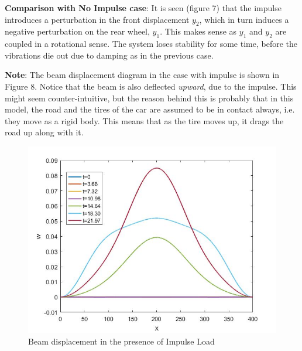 \documentclass[11pt, oneside]{article}   	%
\begin{document}
\noindent \textbf{Comparison with No Impulse case}: It is seen (figure 7) that the impulse introduces a perturbation in the front displacement $y_2$, which in turn induces a negative perturbation on the rear wheel, $y_1$. This makes sense as $y_1$ and $y_2$ are coupled in a rotational sense. The system loses stability for some time, before the vibrations die out due to damping as in the previous case. 

\pagebreak
\noindent \textbf{Note}: The beam displacement diagram in the case with impulse is shown in Figure 8. Notice that the beam is also deflected \textit{upward}, due to the impulse. This might seem counter-intuitive, but the reason behind this is probably that in this model, the road and the tires of the car are assumed to be in contact always, i.e. they move as a rigid body. This means that as the tire moves up, it drags the road up along with it.
\begin{figure}[!htbp]
	\centering
	\includegraphics[scale=0.5]{BeamDispImpulse}
	\caption{Beam displacement in the presence of Impulse Load}
\end{figure}
\end{document}
